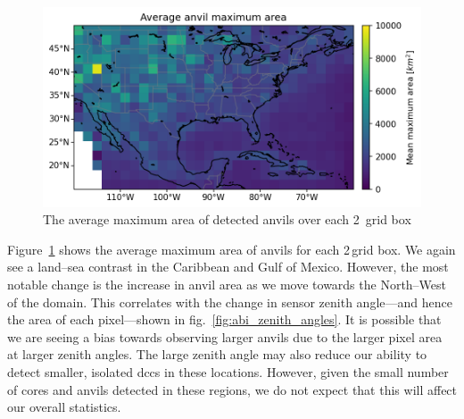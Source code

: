 \begin{figure}[tp]
    \centering
    \includegraphics[width=\textwidth]{figures/ch2_17.png}
    \caption[
    The average maximum area of detected anvils
    ]{
    The average maximum area of detected anvils over each 2\textdegree\ grid box
    }
    \label{fig:anvil_area_map}
\end{figure}

Figure~\ref{fig:anvil_area_map} shows the average maximum area of anvils for each 2\,\textdegree grid box.
We again see a land--sea contrast in the Caribbean and Gulf of Mexico.
However, the most notable change is the increase in anvil area as we move towards the North--West of the domain.
This correlates with the change in sensor zenith angle---and hence the area of each pixel---shown in fig.~\ref{fig:abi_zenith_angles}.
It is possible that we are seeing a bias towards observing larger anvils due to the larger pixel area at larger zenith angles.
The large zenith angle may also reduce our ability to detect smaller, isolated \acrshort{dcc}s in these locations. 
However, given the small number of cores and anvils detected in these regions, we do not expect that this will affect our overall statistics.

